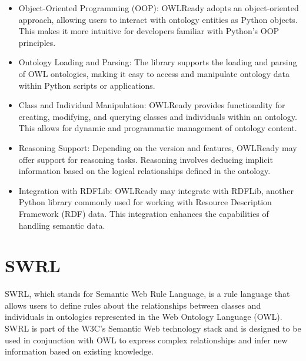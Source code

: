 \documentclass[	pdftex, 
								a4paper,
								11pt, DIV11, BCOR5mm,
								parskip,
								]{scrreprt}
\begin{document}
	\begin{itemize}
		\item Object-Oriented Programming (OOP): OWLReady adopts an object-oriented approach, allowing users to interact with ontology entities as Python objects. This makes it more intuitive for developers familiar with Python's OOP principles.
		\item Ontology Loading and Parsing: The library supports the loading and parsing of OWL ontologies, making it easy to access and manipulate ontology data within Python scripts or applications.
		\item Class and Individual Manipulation: OWLReady provides functionality for creating, modifying, and querying classes and individuals within an ontology. This allows for dynamic and programmatic management of ontology content.
		\item Reasoning Support: Depending on the version and features, OWLReady may offer support for reasoning tasks. Reasoning involves deducing implicit information based on the logical relationships defined in the ontology.
		\item Integration with RDFLib: OWLReady may integrate with RDFLib, another Python library commonly used for working with Resource Description Framework (RDF) data. This integration enhances the capabilities of handling semantic data.
	\end{itemize}

	\section*{SWRL}
	SWRL, which stands for Semantic Web Rule Language, is a rule language that allows users to define rules about the relationships between classes and individuals in ontologies represented in the Web Ontology Language (OWL). SWRL is part of the W3C's Semantic Web technology stack and is designed to be used in conjunction with OWL to express complex relationships and infer new information based on existing knowledge.
\end{document}
